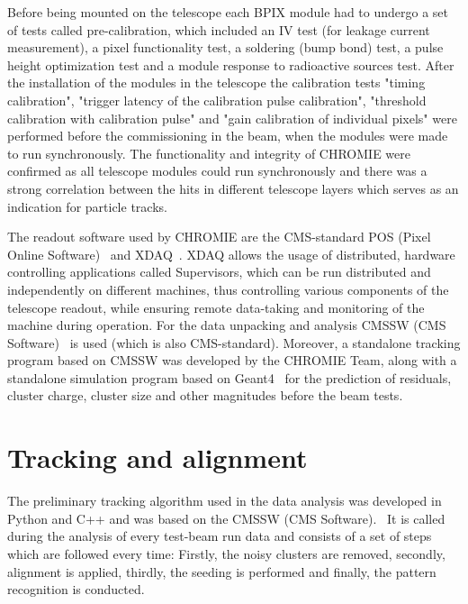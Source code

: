 \documentclass[a4paper,11pt]{article}
\begin{document}

Before being mounted on the telescope each BPIX module had to undergo a set of tests called pre-calibration, which included an IV test (for leakage current measurement), a pixel functionality test, a soldering (bump bond) test, a pulse height optimization test and a module response to radioactive sources test. After the installation of the modules in the telescope the calibration tests "timing calibration", "trigger latency of the calibration pulse calibration", "threshold calibration with calibration pulse" and "gain calibration of individual pixels" were performed before the commissioning in the beam, when the modules were made to run synchronously. The functionality and integrity of CHROMIE were confirmed as all telescope modules could run synchronously and there was a strong correlation between the hits in different telescope layers which serves as an indication for particle tracks.

The readout software used by CHROMIE are the CMS-standard POS (Pixel Online Software)~\cite{g} and XDAQ~\cite{h}. XDAQ allows the usage of distributed, hardware controlling applications called Supervisors, which can be run distributed and independently on different machines, thus controlling various components of the telescope readout, while ensuring remote data-taking and monitoring of the machine during operation. For the data unpacking and analysis CMSSW (CMS Software)~\cite{i} is used (which is also CMS-standard). Moreover, a standalone tracking program based on CMSSW was developed by the CHROMIE Team, along with a standalone simulation program based on Geant4~\cite{j} for the prediction of residuals, cluster charge, cluster size and other magnitudes before the beam tests.

\section{Tracking and alignment}
The preliminary tracking algorithm used in the data analysis was developed in Python and C++ and was based on the CMSSW (CMS Software).~\cite{i} It is called during the analysis of every test-beam run data and consists of a set of steps which are followed every time: Firstly, the noisy clusters are removed, secondly, alignment is applied, thirdly, the seeding is performed and finally, the pattern recognition is conducted. 
\end{document}

